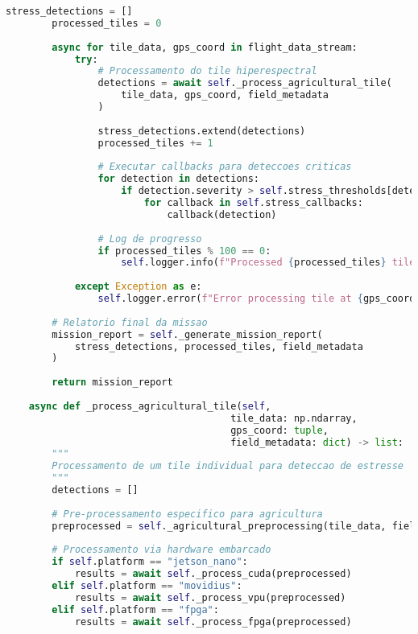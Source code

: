 \begin{lstlisting}[language=Python]
        stress_detections = []
        processed_tiles = 0
        
        async for tile_data, gps_coord in flight_data_stream:
            try:
                # Processamento do tile hiperespectral
                detections = await self._process_agricultural_tile(
                    tile_data, gps_coord, field_metadata
                )
                
                stress_detections.extend(detections)
                processed_tiles += 1
                
                # Executar callbacks para deteccoes criticas
                for detection in detections:
                    if detection.severity > self.stress_thresholds[detection.stress_type]:
                        for callback in self.stress_callbacks:
                            callback(detection)
                
                # Log de progresso
                if processed_tiles % 100 == 0:
                    self.logger.info(f"Processed {processed_tiles} tiles")
                    
            except Exception as e:
                self.logger.error(f"Error processing tile at {gps_coord}: {e}")
        
        # Relatorio final da missao
        mission_report = self._generate_mission_report(
            stress_detections, processed_tiles, field_metadata
        )
        
        return mission_report
    
    async def _process_agricultural_tile(self, 
                                       tile_data: np.ndarray,
                                       gps_coord: tuple,
                                       field_metadata: dict) -> list:
        """
        Processamento de um tile individual para deteccao de estresse
        """
        detections = []
        
        # Pre-processamento especifico para agricultura
        preprocessed = self._agricultural_preprocessing(tile_data, field_metadata)
        
        # Processamento via hardware embarcado
        if self.platform == "jetson_nano":
            results = await self._process_cuda(preprocessed)
        elif self.platform == "movidius":
            results = await self._process_vpu(preprocessed)
        elif self.platform == "fpga":
            results = await self._process_fpga(preprocessed)
        

\end{lstlisting}
